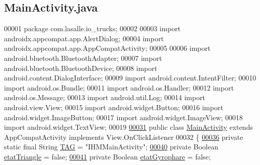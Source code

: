 \hypertarget{_main_activity_8java_source}{}\subsection{Main\+Activity.\+java}
\label{_main_activity_8java_source}

\begin{DoxyCode}
00001 \textcolor{keyword}{package }com.lasalle.io\_trucks;
00002 
00003 \textcolor{keyword}{import} androidx.appcompat.app.AlertDialog;
00004 \textcolor{keyword}{import} androidx.appcompat.app.AppCompatActivity;
00005 
00006 \textcolor{keyword}{import} android.bluetooth.BluetoothAdapter;
00007 \textcolor{keyword}{import} android.bluetooth.BluetoothDevice;
00008 \textcolor{keyword}{import} android.content.DialogInterface;
00009 \textcolor{keyword}{import} android.content.IntentFilter;
00010 \textcolor{keyword}{import} android.os.Bundle;
00011 \textcolor{keyword}{import} android.os.Handler;
00012 \textcolor{keyword}{import} android.os.Message;
00013 \textcolor{keyword}{import} android.util.Log;
00014 \textcolor{keyword}{import} android.view.View;
00015 \textcolor{keyword}{import} android.widget.Button;
00016 \textcolor{keyword}{import} android.widget.ImageButton;
00017 \textcolor{keyword}{import} android.widget.ImageView;
00018 \textcolor{keyword}{import} android.widget.TextView;
00019 
\hyperlink{classcom_1_1lasalle_1_1io__trucks_1_1_main_activity}{00031} \textcolor{keyword}{public} \textcolor{keyword}{class }\hyperlink{classcom_1_1lasalle_1_1io__trucks_1_1_main_activity}{MainActivity} \textcolor{keyword}{extends} AppCompatActivity implements View.OnClickListener
00032 \{
\hyperlink{classcom_1_1lasalle_1_1io__trucks_1_1_main_activity_a37b90dba972711328e3f4c83c55eb0fc}{00036}     \textcolor{keyword}{private} \textcolor{keyword}{static} \textcolor{keyword}{final} String \hyperlink{classcom_1_1lasalle_1_1io__trucks_1_1_main_activity_a37b90dba972711328e3f4c83c55eb0fc}{TAG} = \textcolor{stringliteral}{"IHMMainActivity"};
\hyperlink{classcom_1_1lasalle_1_1io__trucks_1_1_main_activity_a25509a0ae84110cdb8957c51b149213f}{00040}     \textcolor{keyword}{private} Boolean \hyperlink{classcom_1_1lasalle_1_1io__trucks_1_1_main_activity_a25509a0ae84110cdb8957c51b149213f}{etatTriangle} = \textcolor{keyword}{false};
\hyperlink{classcom_1_1lasalle_1_1io__trucks_1_1_main_activity_ac19484cc818434d89d35933a8cbb2b63}{00041}     \textcolor{keyword}{private} Boolean \hyperlink{classcom_1_1lasalle_1_1io__trucks_1_1_main_activity_ac19484cc818434d89d35933a8cbb2b63}{etatGyrophare} = \textcolor{keyword}{false};

\end{DoxyCode}
